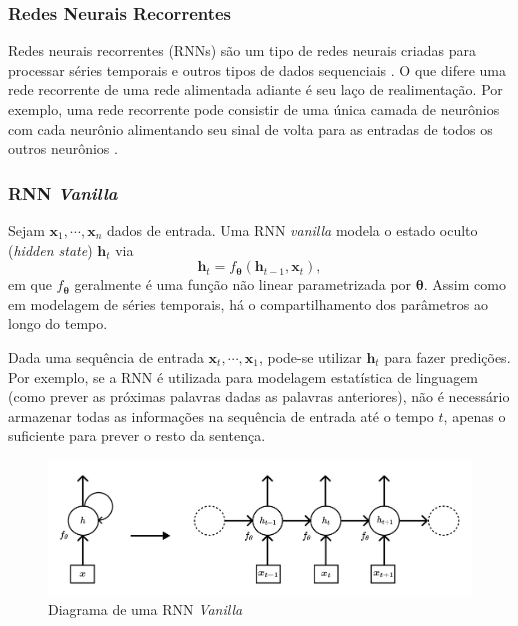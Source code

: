 \documentclass[twoside]{automatextcc}
\newcommand{\bs}[1]{\boldsymbol{#1}}
\begin{document}
            
\subsubsection{Redes Neurais Recorrentes}
Redes neurais recorrentes (RNNs) são um tipo de redes neurais criadas para processar séries temporais e outros tipos de dados sequenciais \citep{fan2021}. O que difere uma rede recorrente de uma rede alimentada adiante é seu laço de realimentação. Por exemplo, uma rede recorrente pode consistir de uma única camada de neurônios com cada neurônio alimentando seu sinal de volta para as entradas de todos os outros neurônios \citep{haykin2009}. 



\subsubsection{RNN \textit{Vanilla}}
Sejam $\bs{x}_{1},\cdots,\bs{x}_{n}$ dados de entrada. Uma  RNN \textit{vanilla} modela o estado oculto (\textit{hidden state}) $\bs{h}_{t}$ via
\begin{equation*}
    \bs{h}_t = f_{\bs{{\theta}}} (\bs{h}_{t-1}, \bs{x}_{t}),    
\end{equation*}
em que $f_{\bs{\theta}}$ geralmente é uma função não linear parametrizada por $\bs{\theta}$. Assim como em modelagem de séries temporais, há o compartilhamento dos parâmetros ao longo do tempo.

Dada uma sequência de entrada $\bs{x}_{t},\cdots,\bs{x}_{1}$, pode-se utilizar $\bs{h}_{t}$ para fazer predições. Por exemplo, se a RNN é utilizada para modelagem estatística de linguagem (como prever as próximas palavras dadas as palavras anteriores), não é necessário armazenar todas as informações na sequência de entrada até o tempo $t$, apenas o suficiente para prever o resto da sentença.

\begin{figure}
    \centering
    \includegraphics[width=\textwidth]{figuras/rnn_hidden_state.pdf}
	\caption{Diagrama de uma RNN \textit{Vanilla} \citep[adaptado de][]{goodfellow2016, kamath2019}}
\end{figure}
\end{document}
